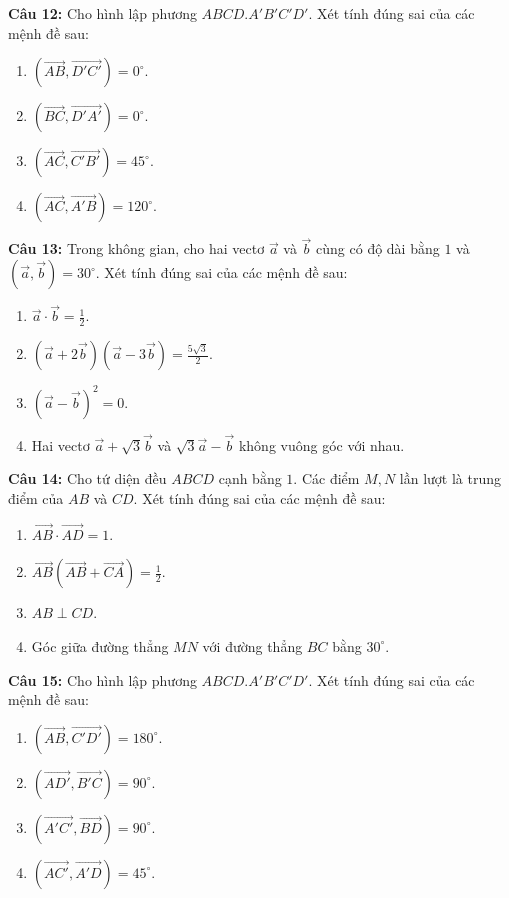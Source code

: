 \documentclass[12pt]{article}
\begin{document}
	\vspace{0.2cm}
	\noindent \textbf{Câu 12:} Cho hình lập phương $ABCD.A'B'C'D'$. Xét tính đúng sai của các mệnh đề sau:
	\begin{enumerate}[label=\alph*)]
		\item $(\overrightarrow{AB}, \overrightarrow{D'C'}) = 0^\circ$.
		\item $(\overrightarrow{BC}, \overrightarrow{D'A'}) = 0^\circ$.
		\item $(\overrightarrow{AC}, \overrightarrow{C'B'}) = 45^\circ$.
		\item $(\overrightarrow{AC}, \overrightarrow{A'B}) = 120^\circ$.
	\end{enumerate}
	
	\vspace{0.2cm}
	\noindent \textbf{Câu 13:} Trong không gian, cho hai vectơ $\vec{a}$ và $\vec{b}$ cùng có độ dài bằng $1$ và $(\vec{a}, \vec{b}) = 30^\circ$. Xét tính đúng sai của các mệnh đề sau:
	\begin{enumerate}[label=\alph*)]
		\item $\vec{a} \cdot \vec{b} = \frac{1}{2}$.
		\item $(\vec{a} + 2\vec{b})(\vec{a} - 3\vec{b}) = \frac{5\sqrt{3}}{2}$.
		\item $(\vec{a} - \vec{b})^2 = 0$.
		\item Hai vectơ $\vec{a} + \sqrt{3}\vec{b}$ và $\sqrt{3}\vec{a} - \vec{b}$ không vuông góc với nhau.
	\end{enumerate}
	
	\vspace{0.2cm}
	\noindent \textbf{Câu 14:} Cho tứ diện đều $ABCD$ cạnh bằng $1$. Các điểm $M, N$ lần lượt là trung điểm của $AB$ và $CD$. Xét tính đúng sai của các mệnh đề sau:
	\begin{enumerate}[label=\alph*)]
		\item $\overrightarrow{AB} \cdot \overrightarrow{AD} = 1$.
		\item $\overrightarrow{AB}(\overrightarrow{AB} + \overrightarrow{CA}) = \frac{1}{2}$.
		\item $AB \perp CD$.
		\item Góc giữa đường thẳng $MN$ với đường thẳng $BC$ bằng $30^\circ$.
	\end{enumerate}
	
	\vspace{0.2cm}
	\noindent \textbf{Câu 15:} Cho hình lập phương $ABCD.A'B'C'D'$. Xét tính đúng sai của các mệnh đề sau:
	\begin{enumerate}[label=\alph*)]
		\item $(\overrightarrow{AB}, \overrightarrow{C'D'}) = 180^\circ$.
		\item $(\overrightarrow{AD'}, \overrightarrow{B'C}) = 90^\circ$.
		\item $(\overrightarrow{A'C'}, \overrightarrow{BD}) = 90^\circ$.
		\item $(\overrightarrow{AC'}, \overrightarrow{A'D}) = 45^\circ$.
	\end{enumerate}
	
\end{document}
